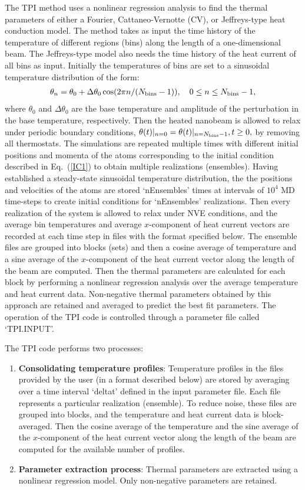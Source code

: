 \documentclass[11pt]{article}
\newcommand {\eqn}[1] {Eq.~(\ref{#1})}
\newcommand{\nbins}{N_{\rm bins}}
\newcommand{\tpi}{TPI\xspace}
\newcommand{\tpicode}{TPI code\xspace}
\numberwithin{equation}{section}
\begin{document}
The \tpi method uses a nonlinear regression analysis to find the thermal
parameters of either a Fourier, Cattaneo-Vernotte (CV), or Jeffreys-type heat
conduction model. The method takes as input the time history of the temperature
of different regions (bins) along the length of a one-dimensional beam. The
Jeffreys-type model also needs the time history of the heat current of all bins as
input. Initially the temperatures of bins are set to a sinusoidal temperature
distribution of the form:
\begin{align}
  \theta_n = \theta_0 + \Delta \theta_0 \cos(2 \pi n/(\nbins-1)), \quad 0 \le n \le
  \nbins-1,
  \label{IC1}
\end{align}
where $\theta_0$ and $\Delta \theta_0$ are the base temperature and amplitude of
the perturbation in the base temperature, respectively. Then the heated nanobeam
is allowed to relax under periodic boundary conditions, $\theta(t)\vert_{n = 0} =
\theta(t)\vert_{n=\nbins-1}, t \ge 0,$ by removing all thermostats. 
The simulations are repeated multiple times with different initial positions and
momenta of the atoms corresponding to the initial condition described in
\eqn{IC1} to obtain multiple realizations (ensembles). Having
established a steady-state sinusoidal temperature distribution, the
the positions and velocities of the atoms are stored `nEnsembles' times at intervals of
$10^4$ MD time-steps to create initial conditions for `nEnsembles' realizations.
Then every realization of the system is allowed to relax
under NVE conditions, and the average bin temperatures and average
$x$-component of heat current vectors are recorded at each time step in files with
the format specified below.
The ensemble files are grouped into blocks (sets) and then a cosine
average of temperature and a sine average of the $x$-component of the heat current vector
along the length of the beam are computed. Then the thermal parameters are
calculated for each block by performing a nonlinear regression analysis over the
average temperature and heat current data. Non-negative thermal parameters obtained
by this approach are retained and averaged to predict the best fit parameters.
The operation of the \tpicode is controlled through a parameter file called `TPI.INPUT'.

The \tpicode performs two processes:
\begin{enumerate}
  \item \textbf{Consolidating temperature profiles}: 
    Temperature profiles in the files provided by the user (in a format described
    below) are stored by averaging over a time interval `deltat' defined in the
    input parameter file. Each file represents a particular realization
    (ensemble). To reduce noise, these files are grouped into blocks, and the
    temperature and heat current data is block-averaged. Then the cosine average of the
    temperature and the sine average of the $x$-component of the heat current vector along the
    length of the beam are computed for the available number of profiles.
  \item \textbf{Parameter extraction process}: Thermal parameters are extracted
    using a nonlinear regression model. Only non-negative parameters are retained.
\end{enumerate}
\end{document}

